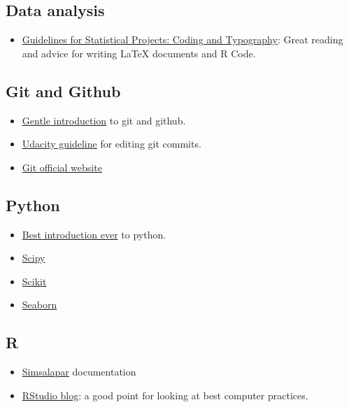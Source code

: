 \documentclass[11pt]{article}
\begin{document}
\subsection{Data analysis}
\label{sec:org7308a96}
\begin{itemize}
\item \href{http://www.math.uwaterloo.ca/\~mhofert/contents/guidelines.pdf}{Guidelines for Statistical Projects: Coding and Typography}:  Great reading
and advice for writing \LaTeX{} documents and R Code.
\end{itemize}

\subsection{Git and Github}
\label{sec:orgafdf1f2}
\begin{itemize}
\item \href{https://www.udacity.com/course/how-to-use-git-and-github--ud775}{Gentle introduction} to git and github.
\item \href{https://udacity.github.io/git-styleguide/}{Udacity guideline} for editing git commits.
\item \href{https://git-scm.com/}{Git official website}
\end{itemize}

\subsection{Python}
\label{sec:org6f571e7}
\begin{itemize}
\item \href{https://www.udacity.com/course/intro-to-computer-science--cs101}{Best introduction ever} to python.
\item \href{http://www.scipy.org/}{Scipy}
\item \href{http://scikit-learn.org/}{Scikit}
\item \href{http://stanford.edu/\~mwaskom/software/seaborn}{Seaborn}
\end{itemize}

\subsection{R}
\label{sec:org290c779}
\begin{itemize}
\item \href{http://arxiv.org/pdf/1309.4402v1}{Simsalapar} documentation
\item \href{http://blog.rstudio.org/}{RStudio blog}: a good point for looking at best computer practices.
\end{itemize}
\end{document}
